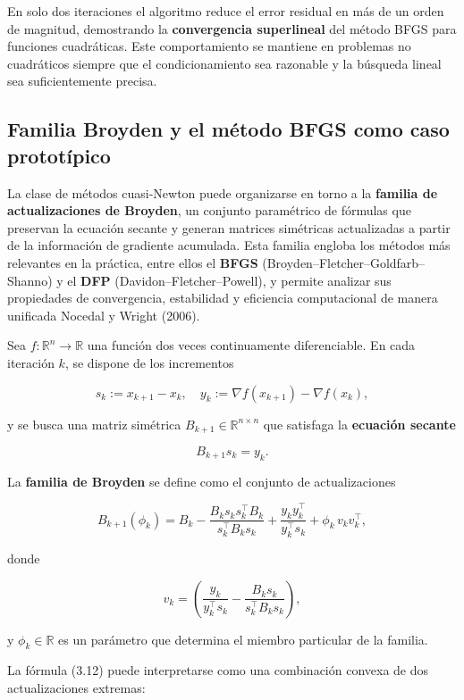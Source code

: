 \documentclass[
  spanish,
  us-letterpaper,
  DIV=11,
  numbers=noendperiod]{scrreprt}
\numberwithin{equation}{section}
\begin{document}
En solo dos iteraciones el algoritmo reduce el error residual en más de
un orden de magnitud, demostrando la \textbf{convergencia superlineal}
del método BFGS para funciones cuadráticas. Este comportamiento se
mantiene en problemas no cuadráticos siempre que el condicionamiento sea
razonable y la búsqueda lineal sea suficientemente precisa.

\subsection{Familia Broyden y el método BFGS como caso
prototípico}\label{familia-broyden-y-el-muxe9todo-bfgs-como-caso-prototuxedpico}

La clase de métodos cuasi-Newton puede organizarse en torno a la
\textbf{familia de actualizaciones de Broyden}, un conjunto paramétrico
de fórmulas que preservan la ecuación secante y generan matrices
simétricas actualizadas a partir de la información de gradiente
acumulada. Esta familia engloba los métodos más relevantes en la
práctica, entre ellos el \textbf{BFGS}
(Broyden--Fletcher--Goldfarb--Shanno) y el \textbf{DFP}
(Davidon--Fletcher--Powell), y permite analizar sus propiedades de
convergencia, estabilidad y eficiencia computacional de manera unificada
Nocedal y Wright (2006).

Sea \(f : \mathbb{R}^n \to \mathbb{R}\) una función dos veces
continuamente diferenciable. En cada iteración \(k\), se dispone de los
incrementos

\[
s_k := x_{k+1} - x_k, \quad y_k := \nabla f(x_{k+1}) - \nabla f(x_k),
\]

y se busca una matriz simétrica \(B_{k+1} \in \mathbb{R}^{n \times n}\)
que satisfaga la \textbf{ecuación secante}

\[
B_{k+1} s_k = y_k. \tag{3.11}
\]

La \textbf{familia de Broyden} se define como el conjunto de
actualizaciones

\[
B_{k+1}(\phi_k) = B_k - \frac{B_k s_k s_k^\top B_k}{s_k^\top B_k s_k}
+ \frac{y_k y_k^\top}{y_k^\top s_k} + \phi_k\, v_k v_k^\top, \tag{3.12}
\]

donde

\[
v_k = \left(\frac{y_k}{y_k^\top s_k} - \frac{B_k s_k}{s_k^\top B_k s_k}\right), \tag{3.13}
\]

y \(\phi_k \in \mathbb{R}\) es un parámetro que determina el miembro
particular de la familia.

La fórmula (3.12) puede interpretarse como una combinación convexa de
dos actualizaciones extremas:
\end{document}

